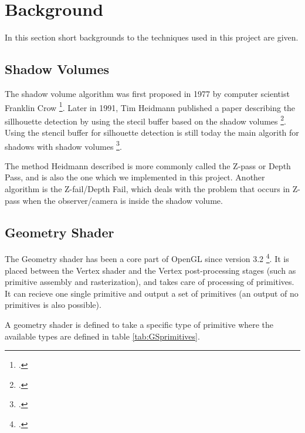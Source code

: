 \documentclass[a4paper, 12pt]{article}
\begin{document}
\section{Background}
In this section short backgrounds to the techniques used in this project are given.
\subsection{Shadow Volumes}
The shadow volume algorithm was first proposed in 1977 by computer scientist Franklin Crow \footcite{CROW77}. Later in 1991, Tim Heidmann published a paper describing the sillhouette detection by using the stecil buffer based on the shadow volumes \footcite{HEIDMANN91}. Using the stencil buffer for silhouette detection is still today the main algorith for shadows with shadow volumes \footcite{KOLIVAND13}. 

The method Heidmann described is more commonly called the Z-pass or Depth Pass, and is also the one which we implemented in this project. Another algorithm is the Z-fail/Depth Fail, which deals with the problem that occurs in Z-pass when the observer/camera is inside the shadow volume. 
\subsection{Geometry Shader}
The Geometry shader has been a core part of OpenGL since version 3.2 \footcite{GEOM}. It is placed between the Vertex shader and the Vertex post-processing stages (such as primitive assembly and rasterization), and takes care of processing of primitives. It can recieve one single primitive and output a set of primitives (an output of no primitives is also possible).

A geometry shader is defined to take a specific type of primitive where the available types are defined in table \ref{tab:GSprimitives}.
\end{document}
